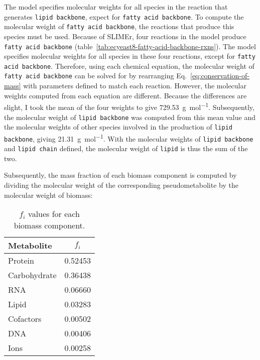 The model specifies molecular weights for all species in the reaction that generates \texttt{lipid backbone}, expect for \texttt{fatty acid backbone}.
To compute the molecular weight of \texttt{fatty acid backbone}, the reactions that produce this species must be used.
Because of SLIMEr, four reactions in the model produce \texttt{fatty acid backbone} (table~\ref{tab:ecyeast8-fatty-acid-backbone-rxns}).
The model specifies molecular weights for all species in these four reactions, except for \texttt{fatty acid backbone}.
Therefore, using each chemical equation, the molecular weight of \texttt{fatty acid backbone} can be solved for by rearranging Eq.\ \ref{eq:conservation-of-mass} with parameters defined to match each reaction.
However, the molecular weights computed from each equation are different.%
Because the differences are slight, %
I took the mean of the four weights to give \SI{729.53}{\gram~\mole^{-1}}.
Subsequently, the molecular weight of \texttt{lipid backbone} was computed from this mean value and the molecular weights of other species involved in the production of \texttt{lipid backbone}, giving \SI{21.31}{\gram~\mole^{-1}}.
With the molecular weights of \texttt{lipid backbone} and \texttt{lipid chain} defined, the molecular weight of \texttt{lipid} is thus the sum of the two.

Subsequently, the mass fraction of each biomass component is computed by dividing the molecular weight of the corresponding pseudometabolite by the molecular weight of biomass:

\begin{table}[ht]
  \centering
  \begin{tabular}{lS}
    Metabolite & {$f_{i}$} \\
    \hline
    Protein & 0.52453 \\
    Carbohydrate & 0.36438 \\
    RNA & 0.06660 \\
    Lipid & 0.03283 \\
    Cofactors & 0.00502 \\
    DNA & 0.00406 \\
    Ions & 0.00258 \\
  \end{tabular}
  \caption{
    $f_{i}$ values for each biomass component.
  }
  \label{tab:model-biomfrac}
\end{table}


